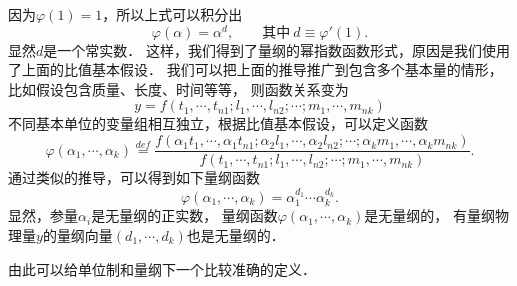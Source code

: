因为$\varphi(1)=1$，所以上式可以积分出
\begin{equation}
\varphi(\alpha) = \alpha^d, \qquad {\text{其中}\ } d\equiv \varphi'(1).
\end{equation}
显然$d$是一个常实数．
这样，我们得到了量纲的幂指数函数形式，原因是我们使用了上面的比值基本假设．
我们可以把上面的推导推广到包含多个基本量的情形，比如假设包含质量、长度、时间等等，
则函数关系变为
\begin{equation}
y=f(t_1,\cdots,t_{n1};l_1,\cdots,l_{n2};\cdots;m_1,\cdots,m_{nk})
\end{equation}
不同基本单位的变量组相互独立，根据比值基本假设，可以定义函数
\begin{equation*}
\varphi(\alpha_1,\cdots,\alpha_k) \overset{def}{=}
\frac{f(\alpha_1 {t}_1,\cdots,\alpha_1 {t}_{n1};
    \alpha_2 {l}_1,\cdots,\alpha_2 {l}_{n2};\cdots;
    \alpha_k {m}_1,\cdots,\alpha_k {m}_{nk})}
{f(t_1,\cdots,t_{n1};l_1,\cdots,l_{n2};\cdots;m_1,\cdots,m_{nk})} .
\end{equation*}
通过类似的推导，可以得到如下{\heiti 量纲函数}
\begin{equation}\label{chunit-dim:eqn_ratio-phik}
\varphi(\alpha_1,\cdots,\alpha_k) = \alpha_1^{d_1}\cdots\alpha_k^{d_k}.
\end{equation}
显然，参量$\alpha_i$是无量纲的正实数，
量纲函数$\varphi(\alpha_1,\cdots,\alpha_k)$是无量纲的，
有量纲物理量$y$的{\heiti 量纲向量}$(d_1,\cdots,d_k)$也是无量纲的．


由此可以给单位制和量纲下一个比较准确的定义．

